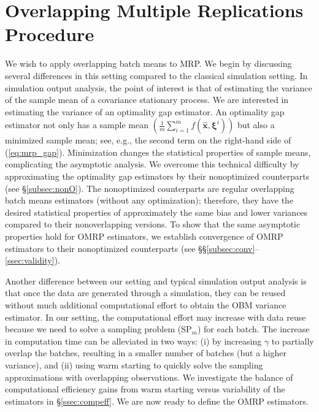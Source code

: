 \documentclass[12pt]{article}
\newcommand{\x}{\mathbf{x}}
\newcommand{\xh}{{\hat{\x}}}
\newcommand{\xit}{\boldsymbol{\xi}}
\newcommand{\xiti}{\xit^i}
\begin{document}
\section{Overlapping Multiple Replications Procedure} 
\label{sec:omrp}

We wish to apply overlapping batch means to MRP. 
We begin by discussing several differences in this setting compared to the classical simulation setting.  
In simulation output analysis, the point of interest is that of estimating the variance of the sample mean of a covariance stationary process.  
We are interested in estimating the variance of an optimality gap estimator.  
An optimality gap estimator not only has a sample mean $(\frac{1}{m} \sum_{i=1}^m f(\xh,\xiti))$ but also a minimized sample mean; see, e.g., the second term on the right-hand side of (\ref{eq:mrp_gap}).  
Minimization changes the statistical properties of sample means, complicating the asymptotic analysis.  
We overcome this technical difficulty by approximating the optimality gap estimators by their nonoptimized counterparts (see \S \ref{subsec:nonO}).  
The nonoptimized counterparts are regular overlapping batch means estimators (without any optimization); therefore, they have the desired statistical properties of approximately the same bias and lower variances compared to their nonoverlapping versions. 
To show that the same asymptotic properties hold for OMRP estimators, we establish convergence of OMRP estimators to their nonoptimized counterparts (see \S\S \ref{subsec:conv}--\ref{ssec:validity}). 

Another difference between our setting and typical simulation output analysis is that once the data are generated through a simulation, they can be reused without much additional computational effort to obtain the OBM variance estimator.  
In our setting, the computational effort may increase with data reuse because we need to solve a sampling problem (SP$_m$) for each batch.  
The increase in computation time can be alleviated in two ways: (i) by increasing $\gamma$ to partially overlap the batches, resulting in a smaller number of batches (but a higher variance), and (ii) using warm starting to quickly solve the sampling approximations with overlapping observations. 
We investigate the balance of computational efficiency gains from warm starting versus variability of the estimators in \S \ref{ssec:compeff}. 
We are now ready to define the OMRP estimators.  
\end{document}
